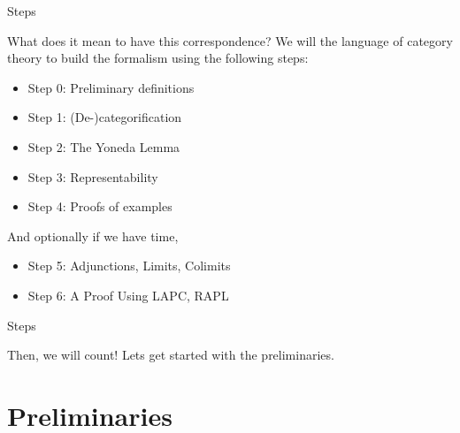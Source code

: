 \documentclass[tikz]{beamer}
\theoremstyle{definition}
\begin{document}
\begin{frame}{Steps}
    
    What does it mean to have this correspondence? We will the language of category theory to build the formalism using the following steps: 
    
\begin{itemize}
    \item Step 0: Preliminary definitions
    \item Step 1: (De-)categorification
    \item Step 2: The Yoneda Lemma
    \item Step 3: Representability
    \item Step 4: Proofs of examples
\end{itemize}
    
And optionally if we have time, 
\begin{itemize}
    \item Step 5: Adjunctions, Limits, Colimits
    \item Step 6: A Proof Using LAPC, RAPL
\end{itemize}
\end{frame}

\begin{frame}{Steps}
    
    Then, we will count! Lets get started with the preliminaries.
\end{frame}

\section{Preliminaries}
\end{document}

